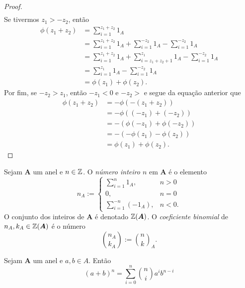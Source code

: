\begin{proof}
\begin{align*}
	\end{align*}
Se tivermos $z_1>-z_2$, então
	\begin{align*}
	\phi(z_1+z_2) &= \sum_{i=1}^{z_1+z_2} 1_A \\
		&= \sum_{i=1}^{z_1+z_2} 1_A + \sum_{i=1}^{-z_2} 1_A - \sum_{i=1}^{-z_2} 1_A \\
		&= \sum_{i=1}^{z_1+z_2} 1_A + \sum_{i=z_1+z_2+1}^{z_1} 1_A - \sum_{i=1}^{-z_2} 1_A \\
		&= \sum_{i=1}^{z_1} 1_A - \sum_{i=1}^{-z_2} 1_A \\
		&= \phi(z_1)+\phi(z_2).
	\end{align*}
Por fim, se $-z_2>z_1$, então $-z_1<0$ e $-z_2>$ e segue da equação anterior que
	\begin{align*}
	\phi(z_1+z_2) &= -\phi(-(z_1+z_2)) \\
		&= -\phi((-z_1)+(-z_2)) \\
		&= -(\phi(-z_1)+\phi(-z_2)) \\
		&= -(-\phi(z_1)-\phi(z_2)) \\
		&= \phi(z_1)+\phi(z_2).
	\end{align*}
\end{proof}

\begin{definition}
Sejam $\bm A$ um anel e $n \in \mathbb{Z}$. O \emph{número inteiro $n$} em $\bm A$ é o elemento
	\begin{equation*}
	n_A := \begin{cases}
		\sum_{i=1}^{n} 1_A,& n>0 \\
		0,& n=0 \\
		\sum_{i=1}^{-n} (-1_A),& n<0.
	\end{cases}
	\end{equation*}
O conjunto dos inteiros de $\bm A$ é denotado $\mathbb{Z}(\bm A)$.
O \emph{coeficiente binomial} de $n_A,k_A \in \mathbb{Z}(\bm A)$ é o número
	\begin{equation*}
	\binom{n_A}{k_A} := \binom{n}{k}_A.
	\end{equation*}
\end{definition}

\begin{proposition}
Sejam $\bm A$ um anel e $a,b \in A$. Então
	\begin{equation*}
	(a+b)^n = \sum_{i=0}^n \binom{n}{i} a^i b^{n-i}
	\end{equation*}
\end{proposition}

